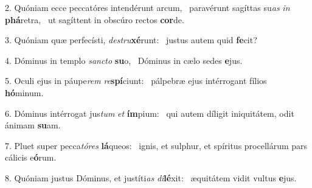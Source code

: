 2. Quóniam ecce peccatóres intendérunt arcum, \dag\  paravérunt sagíttas su\textit{as} \textit{in} \textbf{phá}retra, \ast\  ut sagíttent in obscúro rectos \textbf{cor}de.\

3. Quóniam quæ perfecísti, \textit{de}\textit{stru}\textbf{xé}runt: \ast\  justus autem quid \textbf{fe}cit?\

4. Dóminus in templo \textit{sanc}\textit{to} \textbf{su}o, \ast\  Dóminus in cælo sedes \textbf{e}jus.\

5. Oculi ejus in páupe\textit{rem} \textit{re}\textbf{spí}ciunt: \ast\  pálpebræ ejus intérrogant fílios \textbf{hó}minum.\

6. Dóminus intérrogat jus\textit{tum} \textit{et} \textbf{ím}pium: \ast\  qui autem díligit iniquitátem, odit ánimam \textbf{su}am.\

7. Pluet super pecca\textit{tó}\textit{res} \textbf{lá}queos: \ast\  ignis, et sulphur, et spíritus procellárum pars cálicis e\textbf{ó}rum.\

8. Quóniam justus Dóminus, et justíti\textit{as} \textit{di}\textbf{lé}xit: \ast\  æquitátem vidit vultus \textbf{e}jus.\

